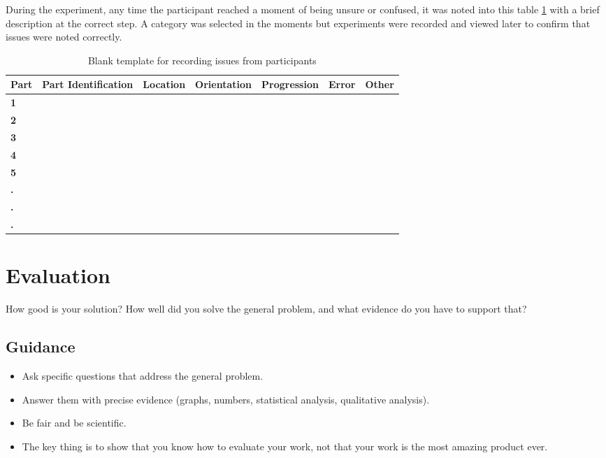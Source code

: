 \documentclass{l4proj}
\begin{document}
During the experiment, any time the participant reached a moment of being unsure or confused, it was noted into this table \ref{tab:blankissues} with a brief description at the correct step. A category was selected in the moments but experiments were recorded and viewed later to confirm that issues were noted correctly.
    \begin{table}[!ht]
         \caption{
         Blank template for recording issues from participants
         }\label{tab:blankissues}
        \centering
        \begin{tabular}{@{}l|llllll@{}}
            \textbf{Part} & \textbf{Part Identification} & \textbf{Location} & \textbf{Orientation} & \textbf{Progression}  & \textbf{Error} & \textbf{Other} \\ \hline
            \textbf{1}  & ~ & ~ & ~ & ~ & ~ & ~ \\ 
            \textbf{2}  & ~ & ~ & ~ & ~ & ~ & ~ \\ 
            \textbf{3}  & ~ & ~ & ~ & ~ & ~ & ~ \\ 
            \textbf{4}  & ~ & ~ & ~ & ~ & ~ & ~ \\ 
            \textbf{5}  & ~ & ~ & ~ & ~ & ~ & ~ \\ 
            \textbf{.}  & ~ & ~ & ~ & ~ & ~ & ~ \\ 
            \textbf{.}  & ~ & ~ & ~ & ~ & ~ & ~ \\ 
            \textbf{.}  & ~ & ~ & ~ & ~ & ~ & ~ \\ 
        \end{tabular}
    \end{table}



\chapter{Evaluation} 
How good is your solution? How well did you solve the general problem, and what evidence do you have to support that?

\section{Guidance}
\begin{itemize}
    \item
        Ask specific questions that address the general problem.
    \item
        Answer them with precise evidence (graphs, numbers, statistical
        analysis, qualitative analysis).
    \item
        Be fair and be scientific.
    \item
        The key thing is to show that you know how to evaluate your work, not
        that your work is the most amazing product ever.
\end{itemize}
\end{document}
